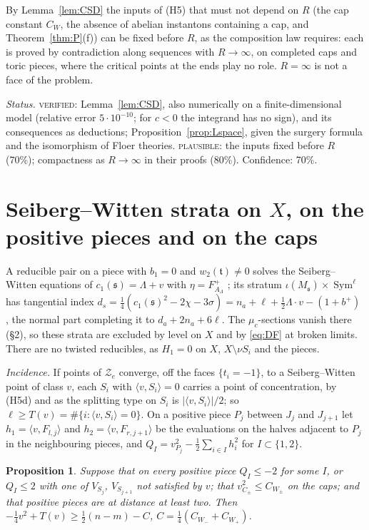 \documentclass[10pt]{amsart}
\numberwithin{equation}{section}
\theoremstyle{compact}
\newtheorem{proposition}[theorem]{Proposition}
\newcommand{\Sym}{\operatorname{Sym}}
\newcommand{\fs}{\mathfrak s}
\newcommand{\ft}{\mathfrak t}
\newcommand{\cZ}{\mathcal Z}
\newcommand{\step}[1]{\par\noindent\textit{#1}\enspace}
\newcommand{\ver}{\textsc{verified}}
\newcommand{\pla}{\textsc{plausible}}
\begin{document}
By Lemma~\ref{lem:CSD} the inputs of (H5) that must not depend on $R$ (the cap
constant $C_W$, the absence of abelian instantons containing a cap, and
Theorem~\ref{thm:P}(f)) can be fixed before $R$, as the composition law
requires: each is proved by contradiction along sequences with $R\to\infty$, on
completed caps and toric pieces, where the critical points at the ends play no
role. $R=\infty$ is not a face of the problem.

\step{Status.} \ver: Lemma~\ref{lem:CSD}, also numerically on a
finite-dimensional model (relative error $5\cdot10^{-10}$; for $c<0$ the
integrand has no sign), and its consequences as deductions;
Proposition~\ref{prop:Lspace}, given the surgery formula and the isomorphism of
Floer theories. \pla: the inputs fixed before $R$ (70\%); compactness as
$R\to\infty$ in their proofs (80\%). Confidence: 70\%.

\section{Seiberg--Witten strata on $X$, on the positive pieces and on the caps}

A reducible pair on a piece with $b_1=0$ and $w_2(\ft)\ne0$ solves the
Seiberg--Witten equations of $c_1(\fs)=\Lambda+v$ with $\eta=F^+_{A_\Lambda}$
\cite[Lemmas~3.12, 3.13]{FL2a}; its stratum $\iota(M_\fs)\times\Sym^\ell$ has
tangential index $d_s=\frac14(c_1(\fs)^2-2\chi-3\sigma)=n_a+\ell+\frac12
\Lambda\cdot v-(1+b^+)$ \cite[(2.63)]{FL2a}, the normal part completing it to
$d_a+2n_a+6\ell$. The $\mu_c$-sections vanish there (\S2), so these strata are
excluded by level on $X$ and by \eqref{eq:DF} at broken limits. There are no
twisted reducibles, as $H_1=0$ on $X$, $X\setminus\nu S_i$ and the pieces.

\emph{Incidence.} If points of $\cZ_e$ converge, off the faces $\{t_i=-1\}$, to
a Seiberg--Witten point of class $v$, each $S_i$ with $\langle v,S_i\rangle=0$
carries a point of concentration, by (H5d) and as the splitting type on $S_i$
is $|\langle v,S_i\rangle|/2$; so $\ell\ge T(v)=\#\{i:\langle
v,S_i\rangle=0\}$. On a positive piece $P_j$ between $J_j$ and $J_{j+1}$ let
$h_1=\langle v,F_{l,j}\rangle$ and $h_2=\langle v,F_{r,j+1}\rangle$ be the
evaluations on the halves adjacent to $P_j$ in the neighbouring pieces, and
$Q_I=v_{P_j}^2-\frac12\sum_{i\in I}h_i^2$ for $I\subset\{1,2\}$.

\begin{proposition}\label{prop:energy2}
Suppose that on every positive piece $Q_I\le-2$ for some $I$, or $Q_I\le2$
with one of $V_{S_j}$, $V_{S_{j+1}}$ not satisfied by $v$; that $v_{C_\pm}^2\le
C_{W_\pm}$ on the caps; and that positive pieces are at distance at least two.
Then $-\frac14v^2+T(v)\ge\frac12(n-m)-C$, $C=\frac14(C_{W_-}+C_{W_+})$.
\end{proposition}
\end{document}
